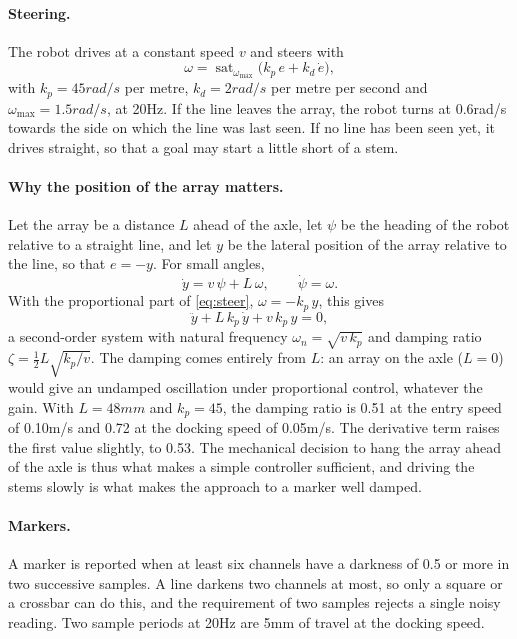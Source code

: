 \paragraph{Steering.} The robot drives at a constant speed $v$ and steers with
\begin{equation}
  \omega = \operatorname{sat}_{\omega_{\max}}\bigl(k_p\,e + k_d\,\dot e\bigr),
  \label{eq:steer}
\end{equation}
with $k_p=45\unit{rad/s}$ per metre, $k_d=2\unit{rad/s}$ per metre per second and
$\omega_{\max}=1.5\unit{rad/s}$, at 20\unit{Hz}. If the line leaves the array, the robot
turns at 0.6\unit{rad/s} towards the side on which the line was last seen. If no line has
been seen yet, it drives straight, so that a goal may start a little short of a stem.

\paragraph{Why the position of the array matters.} Let the array be a distance $L$ ahead of
the axle, let $\psi$ be the heading of the robot relative to a straight line, and let $y$ be
the lateral position of the array relative to the line, so that $e=-y$. For small angles,
\begin{equation}
  \dot y = v\,\psi + L\,\omega, \qquad \dot\psi = \omega .
\end{equation}
With the proportional part of \cref{eq:steer}, $\omega=-k_p\,y$, this gives
\begin{equation}
  \ddot y + L\,k_p\,\dot y + v\,k_p\,y = 0,
  \label{eq:line-dynamics}
\end{equation}
a second-order system with natural frequency $\omega_n=\sqrt{v\,k_p}$ and damping ratio
$\zeta=\tfrac{1}{2}L\sqrt{k_p/v}$. The damping comes entirely from $L$: an array on the axle
($L=0$) would give an undamped oscillation under proportional control, whatever the gain.
With $L=48\unit{mm}$ and $k_p=45$, the damping ratio is 0.51 at the entry speed of
0.10\unit{m/s} and 0.72 at the docking speed of 0.05\unit{m/s}. The derivative term raises
the first value slightly, to 0.53. The mechanical decision to hang the array ahead of the
axle is thus what makes a simple controller sufficient, and driving the stems slowly is what
makes the approach to a marker well damped.

\paragraph{Markers.} A marker is reported when at least six channels have a darkness of 0.5
or more in two successive samples. A line darkens two channels at most, so only a square or
a crossbar can do this, and the requirement of two samples rejects a single noisy reading.
Two sample periods at 20\unit{Hz} are 5\unit{mm} of travel at the docking speed.

